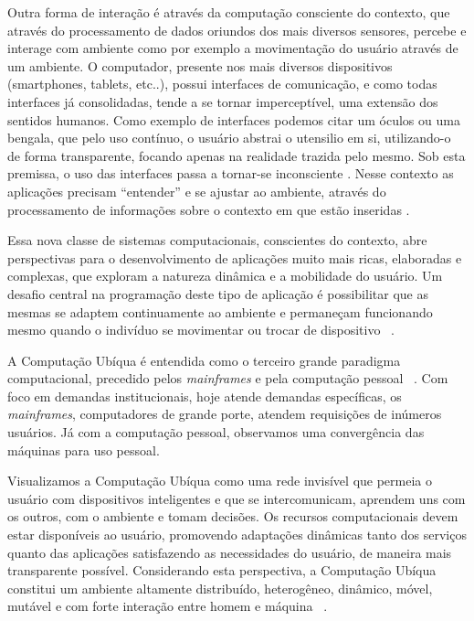 \documentclass[12pt,a4paper,compsoc]{IEEEtran}
\begin{document}
  Outra forma de interação é através da computação consciente do contexto, que através do 
  processamento de dados oriundos dos mais diversos sensores, percebe e interage com ambiente como
  por exemplo a movimentação do usuário através de um ambiente. O computador, presente
  nos mais diversos dispositivos (smartphones, tablets, etc..), possui interfaces de comunicação, e
  como todas interfaces já consolidadas, tende a se tornar imperceptível, uma extensão dos sentidos
  humanos. Como exemplo de interfaces podemos citar um óculos ou uma bengala, que pelo uso 
  contínuo, o usuário abstrai o utensilio em si, utilizando-o de forma transparente, focando apenas
  na realidade trazida pelo mesmo. Sob esta premissa, o uso das interfaces passa a tornar-se
  inconsciente \cite{weiser1993}. Nesse contexto as aplicações precisam ``entender'' e se ajustar
  ao ambiente, através do processamento de informações sobre o contexto em que estão inseridas
  \cite{maciel2004}.
  
  Essa nova classe de sistemas computacionais, conscientes do contexto, abre perspectivas para o
  desenvolvimento de aplicações muito mais ricas, elaboradas e complexas, que exploram a natureza
  dinâmica e a mobilidade do usuário. Um desafio central na programação deste tipo de aplicação é
  possibilitar que as mesmas se adaptem continuamente ao ambiente e permaneçam funcionando mesmo
  quando o indivíduo se movimentar ou trocar de dispositivo ~\cite{GrimmB03, Cac08}.
  
  A Computação Ubíqua é entendida como o terceiro grande paradigma computacional, precedido pelos
  \textit{mainframes} e pela computação pessoal ~\cite{weiser1997}. Com foco em demandas 
  institucionais, hoje atende demandas específicas, os \textit{mainframes}, computadores de grande
  porte, atendem requisições de inúmeros usuários. Já com a computação pessoal, observamos uma
  convergência das máquinas para uso pessoal.
  
  Visualizamos a Computação Ubíqua como uma rede invisível que permeia o usuário com dispositivos
  inteligentes e que se intercomunicam, aprendem uns com os outros, com o ambiente e tomam
  decisões. Os recursos computacionais devem estar disponíveis ao usuário, promovendo adaptações
  dinâmicas tanto dos serviços quanto das aplicações satisfazendo as necessidades do usuário, de 
  maneira mais transparente possível. Considerando esta perspectiva, a Computação Ubíqua constitui
  um ambiente altamente distribuído, heterogêneo, dinâmico, móvel, mutável e com forte interação
  entre homem e máquina ~\cite{Augustin03}.
  
\end{document}
